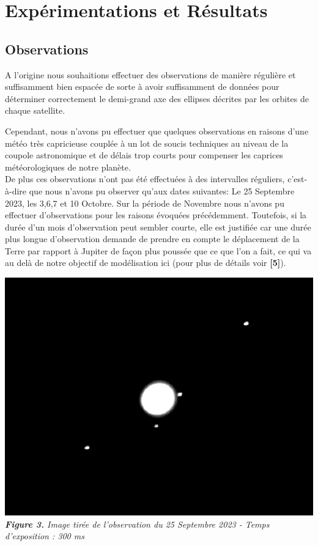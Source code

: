 \documentclass{aa}
\begin{document}


\section{Expérimentations et Résultats}

\subsection{Observations}
A l'origine nous souhaitions effectuer des observations de manière régulière et suffisamment bien espacée de sorte à avoir suffisamment de données pour déterminer correctement le demi-grand axe des ellipses décrites par les orbites de chaque satellite.\break

Cependant, nous n'avons pu effectuer que quelques observations en raisons d'une météo très capricieuse couplée à un lot de soucis techniques au niveau de la coupole astronomique et de délais trop courts pour compenser les caprices météorologiques de notre planète. \\
De plus ces observations n'ont pas été effectuées à des intervalles réguliers, c'est-à-dire que nous n'avons pu observer qu'aux dates suivantes: Le 25 Septembre 2023, les 3,6,7 et 10 Octobre. Sur la période de Novembre nous n'avons pu effectuer d'observations pour les raisons évoquées précédemment. Toutefois, si la durée d'un mois d'observation peut sembler courte, elle est justifiée car une durée plus longue d'observation demande de prendre en compte le déplacement de la Terre par rapport à Jupiter de façon plus poussée que ce que l'on a fait, ce qui va au delà de notre objectif de modélisation ici (pour plus de détails voir \textbf{[5]}).

\begin{center}
\includegraphics[scale = 0.3]{images/Exemple d'observation.PNG}\\
\emph{{\textbf{Figure 3.} Image tirée de l'observation du 25 Septembre 2023 - Temps d'exposition : 300 ms}}
\end{center}
\end{document}
